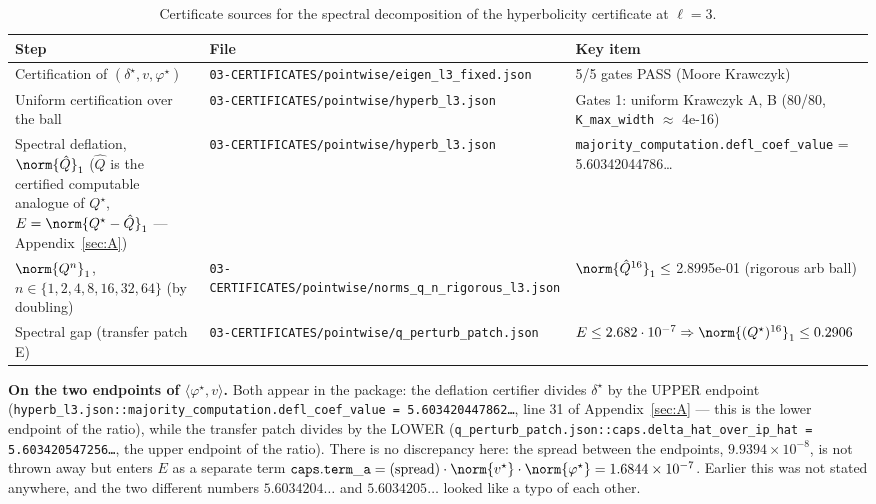 \begin{table}[htbp]
\centering
\small
\caption{Certificate sources for the spectral decomposition of the hyperbolicity certificate at $\ell=3$.}
\label{tab:5.2.2-sources}
\begin{tabular}{p{} p{} p{}}
\toprule
Step & File & Key item \\
\midrule
Certification of $(\delta^{\star}, v, \varphi^{\star})$ &
\texttt{03-\allowbreak CERTIFICATES/\allowbreak pointwise/\allowbreak eigen\_\allowbreak l3\_\allowbreak fixed.json} &
5/5 gates PASS (Moore Krawczyk) \\
Uniform certification over the ball &
\texttt{03-\allowbreak CERTIFICATES/\allowbreak pointwise/\allowbreak hyperb\_\allowbreak l3.json} &
Gates 1: uniform Krawczyk A, B (80/80, \texttt{K\_max\_width} $\approx$ 4e-16) \\
Spectral deflation, $\norm{\hat{Q}}_1$ ($\hat{Q}$ is the certified computable
analogue of $Q^{\star}$, $E=\norm{Q^{\star}-\hat{Q}}_1$ --- Appendix~\ref{sec:A}) &
\texttt{03-\allowbreak CERTIFICATES/\allowbreak pointwise/\allowbreak hyperb\_\allowbreak l3.json} &
\texttt{majority\_\allowbreak computation.\allowbreak defl\_\allowbreak coef\_\allowbreak value} = 5.60342044786\ldots \\
$\norm{Q^n}_1$, $n\in \{1,2,4,8,16,32,64\}$ (by doubling) &
\texttt{03-\allowbreak CERTIFICATES/\allowbreak pointwise/\allowbreak norms\_\allowbreak q\_\allowbreak n\_\allowbreak rigorous\_\allowbreak l3.json} &
$\norm{\hat{Q}^{16}}_1 \le$ 2.8995e-01 (rigorous arb ball) \\
Spectral gap (transfer patch E) &
\texttt{03-\allowbreak CERTIFICATES/\allowbreak pointwise/\allowbreak q\_\allowbreak perturb\_\allowbreak patch.json} &
$E \le 2.682\cdot 10^{-7} \Rightarrow \norm{(Q^{\star})^{16}}_1 \le 0.2906$ \\
\bottomrule
\end{tabular}
\end{table}

\textbf{On the two endpoints of $\langle \varphi^{\star},v\rangle$.} Both
appear in the package: the deflation certifier divides $\delta^{\star}$ by the
UPPER endpoint (\texttt{hyperb\_\allowbreak l3.json\allowbreak ::\allowbreak majority\_\allowbreak computation.\allowbreak defl\_\allowbreak coef\_\allowbreak value =
5.603420447862\ldots}, line 31 of Appendix~\ref{sec:A} --- this is the lower endpoint of
the ratio), while the transfer patch divides by the LOWER
(\texttt{q\_\allowbreak perturb\_\allowbreak patch.json\allowbreak ::\allowbreak caps.delta\_\allowbreak hat\_\allowbreak over\_\allowbreak ip\_\allowbreak hat =
5.603420547256\ldots}, the upper endpoint of the ratio). There is no
discrepancy here: the spread between the endpoints, $9.9394\times 10^{-8}$, is
not thrown away but enters $E$ as a separate term
$\mathtt{caps.term\_a} = (\mathrm{spread})\cdot \norm{v^{\star}}\cdot
\norm{\varphi^{\star}} = 1.6844\times 10^{-7}$. Earlier this was not
stated anywhere, and the two different numbers $5.6034204\ldots$ and
$5.6034205\ldots$ looked like a typo of each other.

